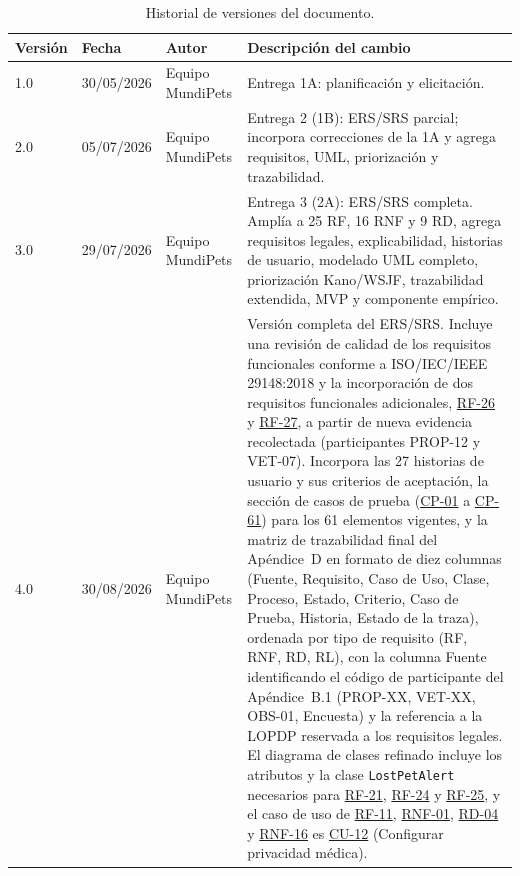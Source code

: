 \documentclass[journal,onecolumn]{IEEEtran}
\begin{document}
	\begin{table}[H]
		\centering
		\caption{Historial de versiones del documento.}
		\label{tab:historial}
		\small
		\begin{tabularx}{\textwidth}{@{}l l l X@{}}
			\toprule
			\textbf{Versión} & \textbf{Fecha} & \textbf{Autor} & \textbf{Descripción del cambio} \\
			\midrule
			1.0 & 30/05/2026 & Equipo MundiPets & Entrega 1A: planificación y elicitación. \\
			2.0 & 05/07/2026 & Equipo MundiPets & Entrega 2 (1B): ERS/SRS parcial; incorpora correcciones de la 1A y agrega requisitos, UML, priorización y trazabilidad. \\
			3.0 & 29/07/2026 & Equipo MundiPets & Entrega 3 (2A): ERS/SRS completa. Amplía a 25 RF, 16 RNF y 9 RD, agrega requisitos legales, explicabilidad, historias de usuario, modelado UML completo, priorización Kano/WSJF, trazabilidad extendida, MVP y componente empírico. \\
			4.0 & 30/08/2026 & Equipo MundiPets & Versión completa del ERS/SRS. Incluye una revisión de calidad de los requisitos funcionales conforme a ISO/IEC/IEEE 29148:2018 y la incorporación de dos requisitos funcionales adicionales, \hyperref[tab:RF-26]{RF-26} y \hyperref[tab:RF-27]{RF-27}, a partir de nueva evidencia recolectada (participantes PROP-12 y VET-07). Incorpora las 27 historias de usuario y sus criterios de aceptación, la sección de casos de prueba (\hyperref[tab:CP-01]{CP-01} a \hyperref[cp:61]{CP-61}) para los 61 elementos vigentes, y la matriz de trazabilidad final del Apéndice~D en formato de diez columnas (Fuente, Requisito, Caso de Uso, Clase, Proceso, Estado, Criterio, Caso de Prueba, Historia, Estado de la traza), ordenada por tipo de requisito (RF, RNF, RD, RL), con la columna Fuente identificando el código de participante del Apéndice~B.1 (PROP-XX, VET-XX, OBS-01, Encuesta) y la referencia a la LOPDP reservada a los requisitos legales. El diagrama de clases refinado incluye los atributos y la clase \texttt{LostPetAlert} necesarios para \hyperref[tab:RF-21]{RF-21}, \hyperref[tab:RF-24]{RF-24} y \hyperref[tab:RF-25]{RF-25}, y el caso de uso de \hyperref[tab:RF-11]{RF-11}, \hyperref[tab:RNF-01]{RNF-01}, \hyperref[tab:RD-04]{RD-04} y \hyperref[tab:RNF-16]{RNF-16} es \hyperref[tab:CU-12]{CU-12} (Configurar privacidad médica). \\
			\bottomrule
		\end{tabularx}
	\end{table}
	
\end{document}
